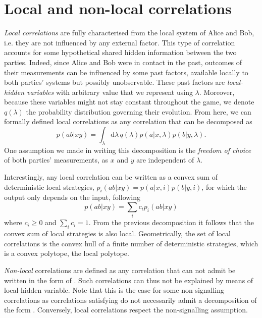 \section{Local and non-local correlations}

\textit{Local correlations} are fully characterised from the local system of Alice and Bob, i.e. they are not influenced by any external factor.
This type of correlation accounts for some hypothetical shared hidden information between the two parties.
Indeed, since Alice and Bob were in contact in the past, outcomes of their measurements can be influenced by some past factors, available locally to both parties' systems but possibly unobservable.
These past factors are \textit{local-hidden variables} with arbitrary value that we represent using $\lambda$.
Moreover, because these variables might not stay constant throughout the game, we denote $q(\lambda)$ the probability distribution governing their evolution. 
From here, we can formally defined local correlations as any correlation that can be decomposed as
\begin{equation}
	p(ab|xy) = \int_\lambda \mathrm{d}\lambda \, q(\lambda) p(a|x,\lambda) p(b|y,\lambda).
	\label{eq:local}
\end{equation}
One assumption we made in writing this decomposition is the \textit{freedom of choice} of both parties' measurements, as $x$ and $y$ are independent of $\lambda$.

Interestingly, any local correlation can be written as a convex sum of deterministic local strategies, $p_i(ab|xy)=p(a|x,i)p(b|y,i)$, for which the output only depends on the input, following
\begin{equation}
	p(ab|xy) = \sum_i c_i p_i(ab|xy)
	\label{eq:polytope}
\end{equation}
where $c_i\geq 0$ and $\sum_i c_i = 1$.
From the previous decomposition it follows that the convex sum of local strategies is also local. 
Geometrically, the set of local correlations is the convex hull of a finite number of deterministic strategies, which is a convex polytope, the local polytope.

\medbreak

\textit{Non-local} correlations are defined as any correlation that can not admit be written in the form of .
Such correlations can thus not be explained by means of local-hidden variable. 
Note that this is the case for some non-signalling correlations as correlations satisfying  do not necessarily admit a decomposition of the form .
Conversely, local correlations respect the non-signalling assumption.

